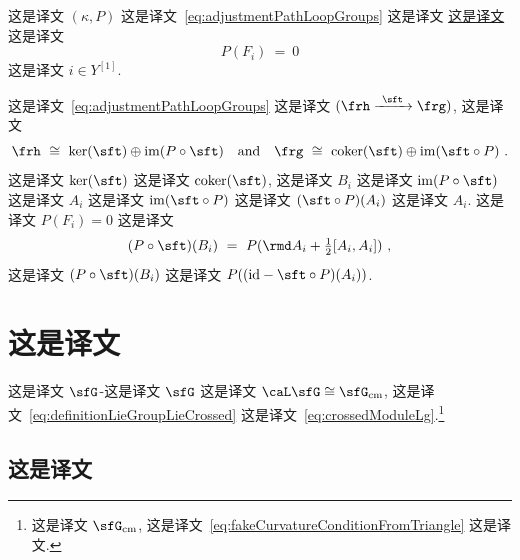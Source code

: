 \documentclass[
    affil-it, %
    auth-lg, %
    british, %
    compression, %
    contents, %
    custom-packages={}, %
    references={bigone}, %
]{lib/preprint}
\newcommand{\coker}{\mathrm{coker}}
\begin{document}
\begin{body}
        \begin{definition}
            这是译文 $(\kappa,P)$ 这是译文~\eqref{eq:adjustmentPathLoopGroups} 这是译文 \uline{这是译文} 这是译文             \begin{equation}\label{eq:adjustedFakeCurvatureCondition}
				P(F_i)\ =\ 0
			\end{equation}  这是译文 $i\in Y^{[1]}$.
        \end{definition}
        
 这是译文~\eqref{eq:adjustmentPathLoopGroups} 这是译文 $(\frh\xrightarrow{~\sft~}\frg)$, 这是译文         \begin{equation}
			\frh\ \cong\ \ker(\sft)\oplus\im(P\circ\sft)
            \eand
            \frg\ \cong\ \coker(\sft)\oplus\im(\sft\circ P)~.
		\end{equation}  这是译文 $\ker(\sft)$ 这是译文 $\coker(\sft)$, 这是译文 $B_i$ 这是译文 $\im(P\circ \sft)$ 这是译文 $A_i$ 这是译文 $\im(\sft\circ P)$ 这是译文 $(\sft\circ P)(A_i)$ 这是译文 $A_i$. 这是译文 $P(F_i)=0$ 这是译文 
        \begin{equation}
			(P\circ \sft)(B_i)\ =\ P(\rmd A_i+\tfrac12[A_i,A_i])~,
		\end{equation}  这是译文 $(P\circ\sft)(B_i)$ 这是译文 $P((\id-\sft\circ P)(A_i))$.
        
        \section{这是译文}

这是译文 $\sfG$-这是译文 $\sfG$ 这是译文 $\caL\sfG\cong\sfG_{\rm cm}$, 这是译文~\eqref{eq:definitionLieGroupLieCrossed} 这是译文~\eqref{eq:crossedModuleLg}.\footnote{这是译文 $\sfG_{\rm cm}$, 这是译文~\eqref{eq:fakeCurvatureConditionFromTriangle} 这是译文.}

        \subsection{这是译文}\label{sec:principalAdjustedHigherPrincipal}


\end{body}
\end{document}
